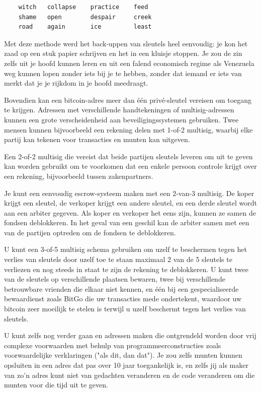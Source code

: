 \begin{verbatim}
    witch   collapse    practice    feed
    shame   open        despair     creek
    road    again       ice         least
\end{verbatim}

Met deze methode werd het back-uppen van sleutels heel eenvoudig: je kon het zaad op een stuk papier schrijven en het in een kluisje stoppen. Je zou de zin zelfs uit je hoofd kunnen leren en uit een falend economisch regime als Venezuela weg kunnen lopen zonder iets bij je te hebben, zonder dat iemand er iets van merkt dat je je rijkdom in je hoofd meedraagt. 

Bovendien kan een bitcoin-adres meer dan één privé-sleutel vereisen om toegang te krijgen. Adressen met verschillende handtekeningen of multisig-adressen kunnen een grote verscheidenheid aan beveiligingssystemen gebruiken. Twee mensen kunnen bijvoorbeeld een rekening delen met 1-of-2 multisig, waarbij elke partij kan tekenen voor transacties en munten kan uitgeven. 

Een 2-of-2 multisig die vereist dat beide partijen sleutels leveren om uit te geven kan worden gebruikt om te voorkomen dat een enkele persoon controle krijgt over een rekening, bijvoorbeeld tussen zakenpartners. 

Je kunt een eenvoudig escrow-systeem maken met een 2-van-3 multisig. De koper krijgt een sleutel, de verkoper krijgt een andere sleutel, en een derde sleutel wordt aan een arbiter gegeven. Als koper en verkoper het eens zijn, kunnen ze samen de fondsen deblokkeren. In het geval van een geschil kan de arbiter samen met een van de partijen optreden om de fondsen te deblokkeren. 

U kunt een 3-of-5 multisig schema gebruiken om uzelf te beschermen tegen het verlies van sleutels door uzelf toe te staan maximaal 2 van de 5 sleutels te verliezen en nog steeds in staat te zijn de rekening te deblokkeren. U kunt twee van de sleutels op verschillende plaatsen bewaren, twee bij verschillende betrouwbare vrienden die elkaar niet kennen, en één bij een gespecialiseerde bewaardienst zoals BitGo die uw transacties mede ondertekent, waardoor uw bitcoin zeer moeilijk te stelen is terwijl u uzelf beschermt tegen het verlies van sleutels. 

U kunt zelfs nog verder gaan en adressen maken die ontgrendeld worden door vrij complexe voorwaarden met behulp van programmeerconstructies zoals voorwaardelijke verklaringen ("als dit, dan dat"). Je zou zelfs munten kunnen opsluiten in een adres dat pas over 10 jaar toegankelijk is, en zelfs jij als maker van zo'n adres kunt niet van gedachten veranderen en de code veranderen om die munten voor die tijd uit te geven. 

